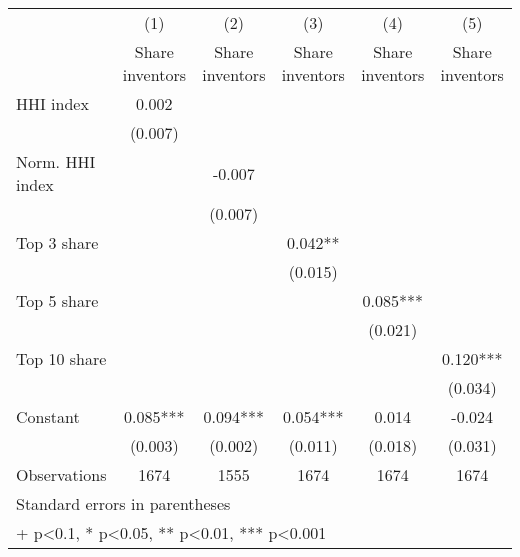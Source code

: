 {
\def\sym#1{\ifmmode^{#1}\else\(^{#1}\)\fi}
\begin{tabular}{l*{5}{c}}
\hline\hline
                    &\multicolumn{1}{c}{(1)}&\multicolumn{1}{c}{(2)}&\multicolumn{1}{c}{(3)}&\multicolumn{1}{c}{(4)}&\multicolumn{1}{c}{(5)}\\
                    &\multicolumn{1}{c}{Share inventors}&\multicolumn{1}{c}{Share inventors}&\multicolumn{1}{c}{Share inventors}&\multicolumn{1}{c}{Share inventors}&\multicolumn{1}{c}{Share inventors}\\
\hline
HHI index           &       0.002   &               &               &               &               \\
                    &     (0.007)   &               &               &               &               \\
[1em]
Norm. HHI index     &               &      -0.007   &               &               &               \\
                    &               &     (0.007)   &               &               &               \\
[1em]
Top 3 share         &               &               &       0.042** &               &               \\
                    &               &               &     (0.015)   &               &               \\
[1em]
Top 5 share         &               &               &               &       0.085***&               \\
                    &               &               &               &     (0.021)   &               \\
[1em]
Top 10 share        &               &               &               &               &       0.120***\\
                    &               &               &               &               &     (0.034)   \\
[1em]
Constant            &       0.085***&       0.094***&       0.054***&       0.014   &      -0.024   \\
                    &     (0.003)   &     (0.002)   &     (0.011)   &     (0.018)   &     (0.031)   \\
\hline
Observations        &        1674   &        1555   &        1674   &        1674   &        1674   \\
\hline\hline
\multicolumn{6}{l}{\footnotesize Standard errors in parentheses}\\
\multicolumn{6}{l}{\footnotesize + p<0.1, * p<0.05, ** p<0.01, *** p<0.001}\\
\end{tabular}
}
